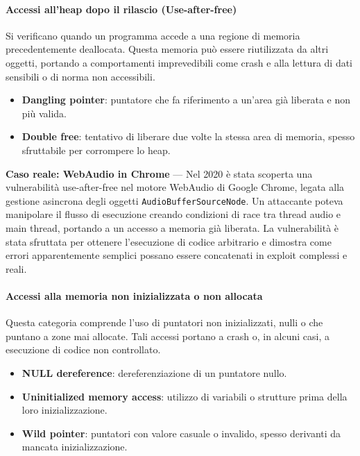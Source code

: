 \paragraph{Accessi all'heap dopo il rilascio (Use-after-free)}
\label{sec:uaf}

Si verificano quando un programma accede a una regione di memoria
precedentemente deallocata. Questa memoria può essere riutilizzata da altri oggetti,
portando a comportamenti imprevedibili come crash e alla lettura di dati
sensibili o di norma non accessibili.

\begin{itemize}
  \item \textbf{Dangling pointer}: puntatore che fa riferimento a un'area già liberata
    e non più valida.

  \item \textbf{Double free}: tentativo di liberare due volte la stessa area di memoria,
    spesso sfruttabile per corrompere lo heap.
\end{itemize}

\textbf{Caso reale: WebAudio in Chrome} — Nel 2020 è stata scoperta una
vulnerabilità use-after-free nel motore WebAudio di Google Chrome, legata alla gestione
asincrona degli oggetti \texttt{AudioBufferSourceNode}. Un attaccante poteva manipolare
il flusso di esecuzione creando condizioni di race tra thread audio e main thread,
portando a un accesso a memoria già liberata. La vulnerabilità è stata sfruttata
per ottenere l'esecuzione di codice arbitrario e dimostra come errori apparentemente
semplici possano essere concatenati in exploit complessi e reali\cite{webaudio_uaf}.

\paragraph{Accessi alla memoria non inizializzata o non allocata}
\label{sec:invalid_access}

Questa categoria comprende l'uso di puntatori non inizializzati, nulli o che puntano
a zone mai allocate. Tali accessi portano a crash o, in alcuni casi, a
esecuzione di codice non controllato.

\begin{itemize}
  \item \textbf{NULL dereference}: dereferenziazione di un puntatore nullo.

  \item \textbf{Uninitialized memory access}: utilizzo di variabili o strutture prima
    della loro inizializzazione.

  \item \textbf{Wild pointer}: puntatori con valore casuale o invalido, spesso
    derivanti da mancata inizializzazione.
\end{itemize}


